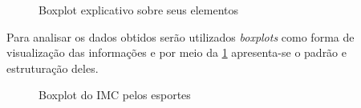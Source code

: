 \documentclass[
]{estat/estat}
\begin{document}
\begin{figure}

\caption{\label{fig-e-box-expli}Boxplot explicativo sobre seus
elementos}


\end{figure}%

Para analisar os dados obtidos serão utilizados \emph{boxplots} como
forma de visualização das informações e por meio da
\ref{fig-e-box-expli} apresenta-se o padrão e estruturação deles.

\begin{figure}[H]

\caption{\label{fig-boxplot}Boxplot do IMC pelos esportes}


\end{figure}%
\end{document}
